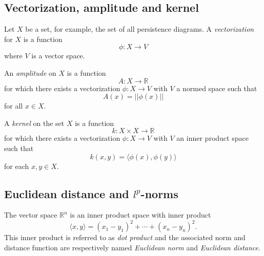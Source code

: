 \documentclass{amsart}
\begin{document}
	\subsection*{Vectorization, amplitude and kernel} \label{vectorization_amplitude_and_kernel}	
	
	Let $X$ be a set, for example, the set of all
	persistence diagrams. A \textit{vectorization} for $X$ is a function	
	\begin{equation*}	
	\phi : X \to V	
	\end{equation*}	
	where $V$ is a vector space. 
	
	An \textit{amplitude} on $X$ is a function	
	\begin{equation*}	
	A : X \to \mathbb R	
	\end{equation*}	
	for which there exists a vectorization $\phi : X \to V$ with $V$ a
	normed space such that	
	\begin{equation*}	
	A(x) = ||\phi(x)||	
	\end{equation*}	
	for all $x \in X$.
	
	A \textit{kernel} on the set $X$ is a function	
	\begin{equation*}	
	k : X \times X \to \mathbb R	
	\end{equation*}	
	for which there exists a vectorization $\phi : X \to V$ with $V$ an
	inner product space such that	
	\begin{equation*}	
	k(x,y) = \langle \phi(x), \phi(y) \rangle	
	\end{equation*}	
	for each $x,y \in X$.
	
	\subsection*{Euclidean distance and $l^p$-norms} \label{euclidean_distance_and_norm}
	
	The vector space $\mathbb R^n$ is an 
	inner product space with inner product 
	\begin{equation*}
	\langle x, y \rangle = (x_1-y_1)^2 + \cdots + (x_n-y_n)^2.
	\end{equation*}
	This inner product is referred to as \textit{dot product} and the associated norm and distance function are respectively named \textit{Euclidean norm} and \textit{Euclidean distance}.
	
\end{document}
